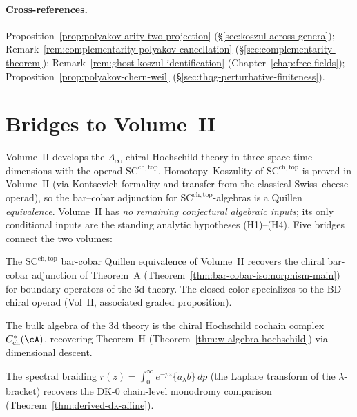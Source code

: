 \paragraph{Cross-references.}
Proposition~\ref{prop:polyakov-arity-two-projection}
(\S\ref{sec:koszul-across-genera});
Remark~\ref{rem:complementarity-polyakov-cancellation}
(\S\ref{sec:complementarity-theorem});
Remark~\ref{rem:ghost-koszul-identification}
(Chapter~\ref{chap:free-fields});
Proposition~\ref{prop:polyakov-chern-weil}
(\S\ref{sec:thqg-perturbative-finiteness}).


\section{Bridges to Volume~II}
\label{sec:cross-volume-bridges}

Volume~II develops the $A_\infty$-chiral Hochschild theory in
three space-time dimensions with the operad
$\mathrm{SC}^{\mathrm{ch,top}}$.  Homotopy--Koszulity of
$\mathrm{SC}^{\mathrm{ch,top}}$ is proved in Volume~II
(via Kontsevich formality and transfer from the classical
Swiss--cheese operad), so the bar--cobar adjunction for
$\mathrm{SC}^{\mathrm{ch,top}}$-algebras is a Quillen
\emph{equivalence}.  Volume~II has \emph{no remaining conjectural
algebraic inputs}; its only conditional inputs are the
standing analytic hypotheses (H1)--(H4).
Five bridges connect the two volumes:

\begin{proposition}
\label{conj:vol2-bar-cobar-bridge}
The $\mathrm{SC}^{\mathrm{ch,top}}$ bar-cobar Quillen equivalence of
Volume~II recovers the chiral bar-cobar adjunction of Theorem~A
(Theorem~\ref{thm:bar-cobar-isomorphism-main}) for boundary
operators of the 3d theory.  The closed color specializes to the BD
chiral operad (Vol~II, associated graded proposition).
\end{proposition}

\begin{conjecture}
\label{conj:vol2-hochschild-bridge}
The bulk algebra of the 3d theory is the chiral Hochschild cochain
complex $C^*_{\mathrm{ch}}(\cA)$, recovering Theorem~H
(Theorem~\ref{thm:w-algebra-hochschild}) via dimensional
descent.
\end{conjecture}

\begin{proposition}
\label{conj:vol2-dk-ybe-bridge}
The spectral braiding $r(z) = \int_0^\infty e^{-pz}
\{a_\lambda b\}\,dp$ (the Laplace transform of the
$\lambda$-bracket) recovers the DK-0 chain-level
monodromy comparison (Theorem~\ref{thm:derived-dk-affine}).
\end{proposition}

